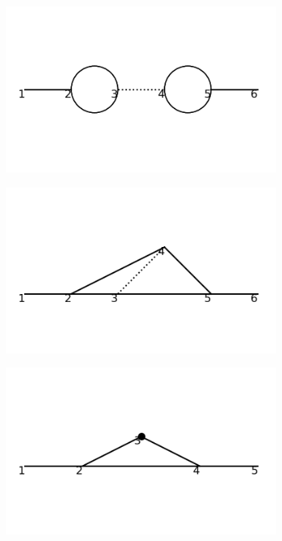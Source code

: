 \documentclass[11pt,a4paper,twoside,pdf]{article}
\numberwithin{equation}{section}
\begin{document}
\begin{figure}[h!]
\begin{subfigure}[t]{0.19\textwidth}
        \caption{ }
    \end{subfigure}
    \begin{subfigure}[t]{0.19\textwidth}
        \centering
        \includegraphics[width=\textwidth]{plots/order4_1to1/6.png}
        \caption{ }
    \end{subfigure}
    \begin{subfigure}[t]{0.19\textwidth}
        \centering
        \includegraphics[width=\textwidth]{plots/order4_1to1/7.png}
        \caption{ }
    \end{subfigure}
    \begin{subfigure}[t]{0.19\textwidth}
        \centering
        \includegraphics[width=\textwidth]{plots/order4_1to1/counterterms/1.png}

\end{subfigure}
\end{figure}
\end{document}
